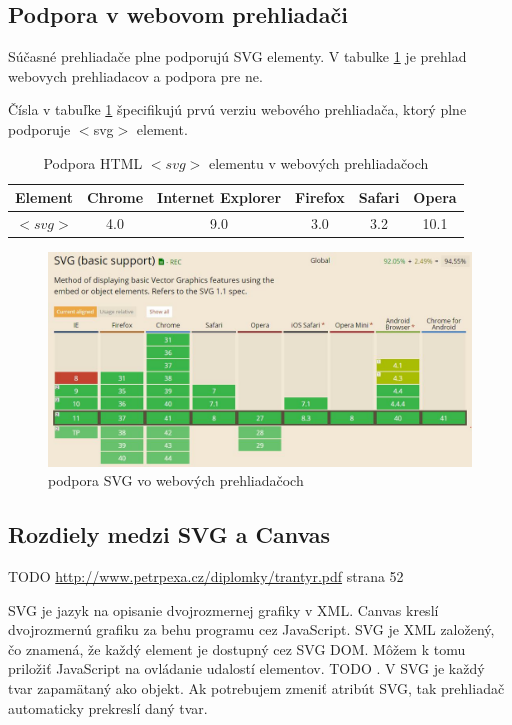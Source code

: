  
 \subsection{Podpora v webovom prehliadači}
 Súčasné prehliadače plne podporujú SVG elementy. V tabulke  \ref{svgpreh} je prehlad webovych prehliadacov a podpora pre ne. 
  
  Čísla v tabuľke \ref{svgpreh} špecifikujú prvú verziu webového prehliadača, ktorý plne podporuje $<$svg$>$ element.\cite{w3svg}
  
\begin{table}[hp]
\begin{center}
		\begin{tabular}{|c|c|c|c|c|c|}
		\hline \textbf{Element} & \textbf{Chrome} & \textbf{Internet} \textbf{Explorer}  & \textbf{Firefox}  & \textbf{Safari} & \textbf{Opera}  \\ 
		\hline $<svg>$ & 4.0& 9.0 & 3.0 & 3.2  &   10.1 \\ 
		\hline 
	\end{tabular} 
\end{center}
	
	\caption{Podpora HTML $<svg>$ elementu v webových prehliadačoch}
	\label{svgpreh}
\end{table}
 
 \begin{figure}
\centering
\includegraphics[width=0.7\linewidth]{obrazky/podpora}
\caption{podpora SVG vo webových prehliadačoch}
\label{fig:podpora}
\end{figure}

 
 
 \subsection{Rozdiely medzi SVG a Canvas}
TODO \url{http://www.petrpexa.cz/diplomky/trantyr.pdf} strana 52


 SVG je jazyk na opisanie dvojrozmernej grafiky v XML. 
 Canvas kreslí dvojrozmernú grafiku za behu programu cez JavaScript.
 SVG je XML založený, čo znamená, že každý element je dostupný cez SVG DOM. Môžem k tomu priložiť JavaScript na ovládanie udalostí elementov. TODO . 
 V SVG je každý tvar zapamätaný ako objekt. Ak potrebujem zmeniť atribút SVG, tak prehliadač  automaticky prekreslí daný tvar.
 
